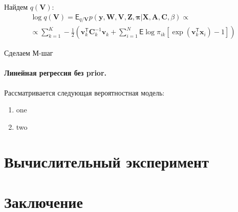 \documentclass[12pt, twoside]{article}
\numberwithin{equation}{section}
\begin{document}
Найдем $q\left(\textbf{V}\right)$:
\begin{equation}
\label{eq:st:36}
\begin{aligned}
\log q\left(\textbf{V}\right) =\mathsf{E}_{q/\textbf{V}}p\left(\textbf{y}, \textbf{W}, \textbf{V}, \textbf{Z}, \bm{\pi}|\textbf{X}, \textbf{A}, \textbf{C}, \beta\right) \propto \\
\propto \sum_{k=1}^{K}-\frac{1}{2}\left(\textbf{v}_k^{\mathsf{T}}\textbf{C}_k^{-1}\textbf{v}_k + \sum_{i=1}^{N}\mathsf{E}\log\pi_{ik}\left[\exp\left(\textbf{v}_{k}^{\mathsf{T}}\textbf{x}_i\right) - 1\right]\right)
\end{aligned}
\end{equation}

Сделаем М-шаг

\paragraph{Линейная регрессия без prior.} Рассматривается следующая вероятностная модель:
\begin{enumerate}
	\item one
	\item two
\end{enumerate}



\section{Вычислительный эксперимент}

\section{Заключение}

\begin{thebibliography}{99}

\end{thebibliography}
\end{document}
